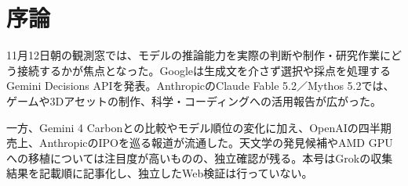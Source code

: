 \section{序論}
11月12日朝の観測窓では、モデルの推論能力を実際の判断や制作・研究作業にどう接続するかが焦点となった。Googleは生成文を介さず選択や採点を処理するGemini Decisions APIを発表。AnthropicのClaude Fable 5.2／Mythos 5.2では、ゲームや3Dアセットの制作、科学・コーディングへの活用報告が広がった。

一方、Gemini 4 Carbonとの比較やモデル順位の変化に加え、OpenAIの四半期売上、AnthropicのIPOを巡る報道が流通した。天文学の発見候補やAMD GPUへの移植については注目度が高いものの、独立確認が残る。本号はGrokの収集結果を記載順に記事化し、独立したWeb検証は行っていない。